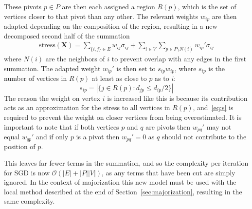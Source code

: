 These pivots $p\in P$ are then each assigned a region $R(p)$, which is the set of vertices closer to that pivot than any other. The relevant weights $w_{ip}$ are then adapted depending on the composition of the region, resulting in a new decomposed second half of the summation
\begin{equation}
  \begin{split}
  \text{stress}(\mathbf{X}) = \sum_{\{i,j\}\in E}w_{ij}\sigma_{ij}
  + \sum_{i\in V}\sum_{p\in P\setminus N(i)}w_{ip}'\sigma_{ij}
  \end{split}
  \label{eq:pivot_stress}
\end{equation}
where $N(i)$ are the neighbors of $i$ to prevent overlap with any edges in the first summation.
The adapted weight $w_{ip}'$ is then set to $s_{ip} w_{ip}$, where $s_{ip}$ is the number of vertices in $R(p)$ at least as close to $p$ as to $i$:
\begin{equation}
  s_{ip}=|\{j\in R(p): d_{jp} \leq d_{ip}/2\}|
  \label{eq:s}
\end{equation}
The reason the weight on vertex $i$ is increased like this is because its contribution acts as an approximation for the stress to all vertices in $R(p)$, and~\eqref{eq:s} is required to prevent the weight on closer vertices from being overestimated.
It is important to note that if both vertices $p$ and $q$ are pivots then $w_{pq}'$ may not equal $w_{qp}'$ and if only $p$ is a pivot then $w_{pq}'=0$ as $q$ should not contribute to the position of $p$.

This leaves far fewer terms in the summation, and so the complexity per iteration for SGD is now $\mathcal{O}(|E| + |P||V|)$, as any terms that have been cut are simply ignored. In the context of majorization this new model must be used with the local method described at the end of Section~\ref{sec:majorization}, resulting in the same complexity.

